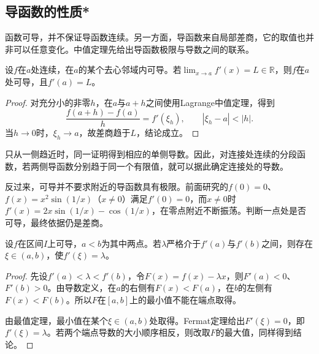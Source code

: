 \endgroup
\FloatBarrier
\newpage
\begingroup
\setlength{\parskip}{2.5pt}
\setlength{\abovedisplayskip}{7pt}
\setlength{\belowdisplayskip}{7pt}
\subsection{导函数的性质*}

函数可导，并不保证导函数连续。另一方面，导函数来自局部差商，它的取值也并非可以任意变化。中值定理先给出导函数极限与导数之间的联系。

\begin{theorem}[导数极限定理]\label{thm:calculus-derivative-limit}
设\(f\)在\(a\)处连续，在\(a\)的某个去心邻域内可导。若\(\lim_{x\to a}f'(x)=L\in\mathbb R\)，则\(f\)在\(a\)处可导，且\(f'(a)=L\)。
\end{theorem}

\begin{proof}
对充分小的非零\(h\)，在\(a\)与\(a+h\)之间使用Lagrange中值定理，得到
\begin{equation*}
 \frac{f(a+h)-f(a)}h=f'(\xi_h),\qquad |\xi_h-a|<|h|.
\end{equation*}
当\(h\to0\)时，\(\xi_h\to a\)，故差商趋于\(L\)，结论成立。
\end{proof}

只从一侧趋近时，同一证明得到相应的单侧导数。因此，对连接处连续的分段函数，若两侧导函数分别趋于同一个有限值，就可以据此确定连接处的导数。

反过来，可导并不要求附近的导函数具有极限。前面研究的\(f(0)=0\)、\(f(x)=x^2\sin(1/x)\)（\(x\ne0\)）满足\(f'(0)=0\)，而\(x\ne0\)时\(f'(x)=2x\sin(1/x)-\cos(1/x)\)，在零点附近不断振荡。判断一点处是否可导，最终依据仍是差商。

\begin{theorem}[Darboux定理]\label{thm:calculus-derivative-intermediate-value}
设\(f\)在区间\(I\)上可导，\(a<b\)为其中两点。若\(\lambda\)严格介于\(f'(a)\)与\(f'(b)\)之间，则存在\(\xi\in(a,b)\)，使\(f'(\xi)=\lambda\)。
\end{theorem}

\begin{proof}
先设\(f'(a)<\lambda<f'(b)\)，令\(F(x)=f(x)-\lambda x\)，则\(F'(a)<0\)、\(F'(b)>0\)。由导数定义，在\(a\)的右侧有\(F(x)<F(a)\)，在\(b\)的左侧有\(F(x)<F(b)\)。所以\(F\)在\([a,b]\)上的最小值不能在端点取得。

由最值定理，最小值在某个\(\xi\in(a,b)\)处取得。Fermat定理给出\(F'(\xi)=0\)，即\(f'(\xi)=\lambda\)。若两个端点导数的大小顺序相反，则改取\(F\)的最大值，同样得到结论。
\end{proof}


